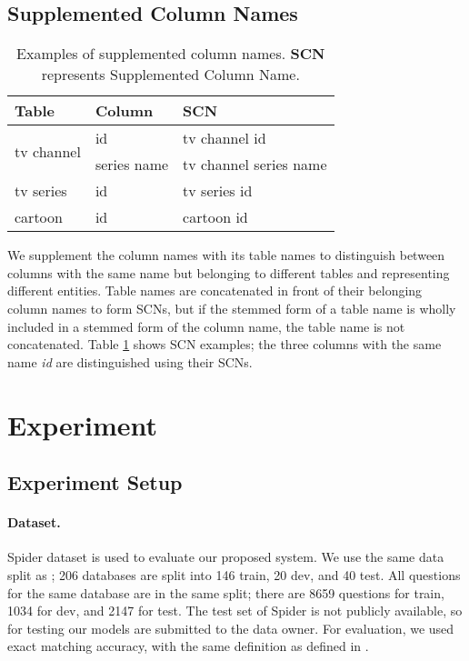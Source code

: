 \documentclass[11pt,a4paper]{article}
\begin{document}
\subsection{Supplemented Column Names}

\begin{table}
\centering
\begin{tabular}{|l|l|l|}\hline
\textbf{Table}&\textbf{Column}&\textbf{SCN} \\ \hline
\multirow{2}{*}{tv channel} & id & tv channel id \\ \cline{2-3}
& series name & tv channel series name \\ \hline
tv series & id & tv series id \\ \hline
cartoon & id & cartoon id \\ \hline
\end{tabular}
\caption{Examples of supplemented column names. \textbf{SCN} represents Supplemented Column Name.}
\label{tbl:scn}
\end{table}

We supplement the column names with its table names to distinguish between columns with the same name but belonging to different tables and representing different entities. Table names are concatenated in front of their belonging column names to form SCNs, but if the stemmed form of a table name is wholly included in a stemmed form of the column name, the table name is not concatenated.  Table \ref{tbl:scn} shows SCN examples; the three columns with the same name \textit{id} are distinguished using their SCNs.

 \section{Experiment}

\subsection{Experiment Setup}
\paragraph{Dataset.} Spider dataset \citep{Yu:18} is used to evaluate our proposed system. We use the same data split as \citet{Yu:18}; 206 databases are split into 146 train, 20 dev, and 40 test. All questions for the same database are in the same split; there are 8659 questions for train, 1034 for dev, and 2147 for test. The test set of Spider is not publicly available, so for testing our models are submitted to the data owner. For evaluation, we used exact matching accuracy, with the same definition as defined in \citet{Yu:18}.
\end{document}
